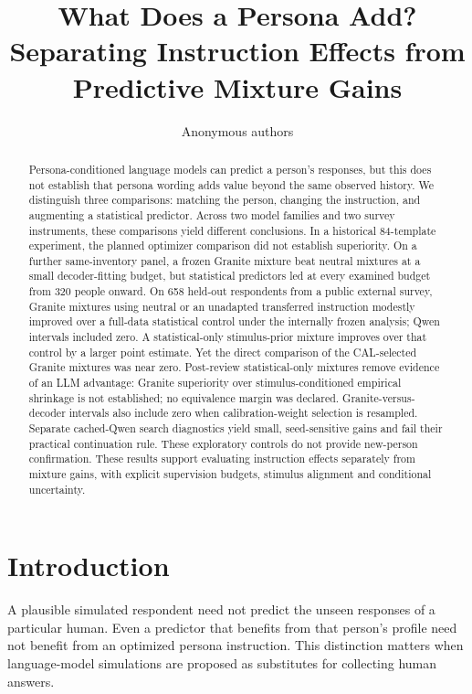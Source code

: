 \documentclass[11pt]{article}
\title{What Does a Persona Add? Separating Instruction Effects from Predictive Mixture Gains}
\author{Anonymous authors}
\begin{document}
\maketitle
\begin{abstract}
Persona-conditioned language models can predict a person's responses, but this does not establish that persona wording adds value beyond the same observed history. We distinguish three comparisons: matching the person, changing the instruction, and augmenting a statistical predictor. Across two model families and two survey instruments, these comparisons yield different conclusions. In a historical 84-template experiment, the planned optimizer comparison did not establish superiority. On a further same-inventory panel, a frozen Granite mixture beat neutral mixtures at a small decoder-fitting budget, but statistical predictors led at every examined budget from 320 people onward. On 658 held-out respondents from a public external survey, Granite mixtures using neutral or an unadapted transferred instruction modestly improved over a full-data statistical control under the internally frozen analysis; Qwen intervals included zero. A statistical-only stimulus-prior mixture improves over that control by a larger point estimate. Yet the direct comparison of the CAL-selected Granite mixtures was near zero. Post-review statistical-only mixtures remove evidence of an LLM advantage: Granite superiority over stimulus-conditioned empirical shrinkage is not established; no equivalence margin was declared. Granite-versus-decoder intervals also include zero when calibration-weight selection is resampled. Separate cached-Qwen search diagnostics yield small, seed-sensitive gains and fail their practical continuation rule. These exploratory controls do not provide new-person confirmation. These results support evaluating instruction effects separately from mixture gains, with explicit supervision budgets, stimulus alignment and conditional uncertainty.
\end{abstract}

\section{Introduction}
A plausible simulated respondent need not predict the unseen responses of a particular human. Even a predictor that benefits from that person's profile need not benefit from an optimized persona instruction. This distinction matters when language-model simulations are proposed as substitutes for collecting human answers.
\end{document}
